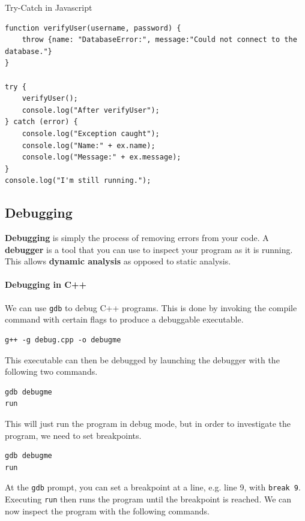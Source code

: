 \begin{listing}
\caption{Try-Catch in Javascript}
\label{lis:trycatchjs}

\begin{verbatim}
function verifyUser(username, password) {
	throw {name: "DatabaseError:", message:"Could not connect to the database."}
}

try {
	verifyUser();
	console.log("After verifyUser");
} catch (error) {
	console.log("Exception caught");
	console.log("Name:" + ex.name);
	console.log("Message:" + ex.message);
}
console.log("I'm still running.");

\end{verbatim}
\end{listing}

\subsection{Debugging}

\textbf{Debugging} is simply the process of removing errors from your code. A \textbf{debugger} is a tool that you can use to inspect your program as it is running. This allows \textbf{dynamic analysis} as opposed to static analysis.

\paragraph{Debugging in C++}
We can use \texttt{gdb} to debug C++ programs. This is done by invoking the compile command with certain flags to produce a debuggable executable.


\begin{verbatim}
g++ -g debug.cpp -o debugme
\end{verbatim}


This executable can then be debugged by launching the debugger with the following two commands.


\begin{verbatim}
gdb debugme
run
\end{verbatim}

This will just run the program in debug mode, but in order to investigate the program, we need to set breakpoints.

\begin{verbatim}
gdb debugme
run
\end{verbatim}

At the \texttt{gdb} prompt, you can set a breakpoint at a line, e.g. line 9, with \texttt{break 9}. Executing \texttt{run} then runs the program until the breakpoint is reached. We can now inspect the program with the following commands.

